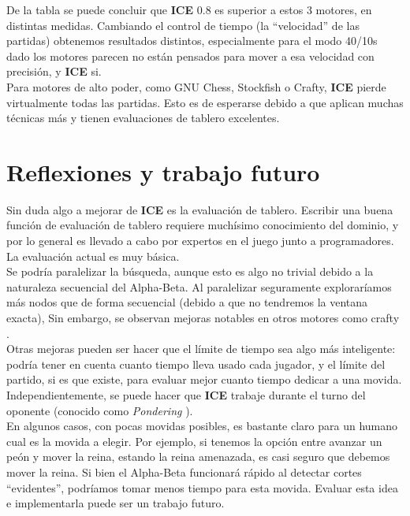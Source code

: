 \documentclass{article}
\newcommand{\ICE}[0]{{\bf ICE}}
\begin{document}
\begin{multicols}{2}
De la tabla se puede concluir que \ICE{} 0.8 es superior a estos
3 motores, en distintas medidas. Cambiando el control de tiempo
(la ``velocidad'' de las partidas) obtenemos resultados distintos,
especialmente para el modo 40/10s dado los motores parecen no están
pensados para mover a esa velocidad con precisión, y \ICE{} si.
\\

Para motores de alto poder, como GNU Chess, Stockfish o Crafty, \ICE{}
pierde virtualmente todas las partidas. Esto es de esperarse debido
a que aplican muchas técnicas más y tienen evaluaciones de tablero
excelentes.
\\

\section{Reflexiones y trabajo futuro}
Sin duda algo a mejorar de \ICE{} es la evaluación de tablero. Escribir
una buena función de evaluación de tablero requiere muchísimo
conocimiento del dominio, y por lo general es llevado a cabo por
expertos en el juego junto a programadores. La evaluación actual es muy
básica.
\\

Se podría paralelizar la búsqueda\cite{parallel-ab}, aunque esto
es algo no trivial debido a la naturaleza secuencial del Alpha-Beta.
Al paralelizar seguramente exploraríamos más nodos que de forma
secuencial (debido a que no tendremos la ventana exacta), Sin embargo,
se observan mejoras notables en otros motores como crafty \cite{crafty}
\cite{crafty-threads}.
\\

Otras mejoras pueden ser hacer que el límite de tiempo sea algo más
inteligente: podría tener en cuenta cuanto tiempo lleva usado cada
jugador, y el límite del partido, si es que existe, para evaluar
mejor cuanto tiempo dedicar a una movida. Independientemente, se puede
hacer que \ICE{} trabaje durante el turno del oponente (conocido como
\emph{Pondering}\cite{pondering} \cite{wiki:pondering}).
\\

En algunos casos, con pocas movidas posibles, es bastante claro para un
humano cual es la movida a elegir. Por ejemplo, si tenemos la opción
entre avanzar un peón y mover la reina, estando la reina amenazada,
es casi seguro que debemos mover la reina. Si bien el Alpha-Beta
funcionará rápido al detectar cortes ``evidentes'', podríamos tomar
menos tiempo para esta movida. Evaluar esta idea e implementarla puede
ser un trabajo futuro.
\\


\end{multicols}
\end{document}
